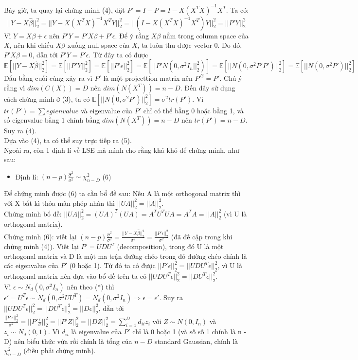 \documentclass[10pt]{article}
\begin{document}
\begin{enumerate}
Bây giờ, ta quay lại chứng minh (4), đặt $P'=I-P=I-X(X^{T}X)^{-1}X^{T}$. Ta có:
\[||Y-X\hat{\beta}||^2_2 = ||Y-X(X^{T}X)^{-1}X^{T}Y||_2^2=||(I-X(X^{T}X)^{-1}X^{T})Y||_2^2 = ||P'Y||_2^2 \]
Vì $Y=X\beta + \epsilon$ nên $P'Y=P'X\beta + P'\epsilon$. Để ý rằng $X\beta$ nằm trong column space của $X$, nên khi chiếu $X\beta$ xuống null space của $X$, ta luôn thu được vector 0. Do đó, $P'X\beta = 0$, dẫn tới $P'Y=P'\epsilon$. Từ đây ta có được 
\[\mathbb{E}[||Y-X\hat{\beta}||^2_2]=\mathbb{E}[||P'Y||_2^2]=\mathbb{E}[||P'\epsilon||_2^2] =\mathbb{E}[||P'N(0, \sigma^2 I_n||^2_2)] = \mathbb{E}[||N(0, \sigma^2 P' P')||^2_2] =\mathbb{E}[||N(0, \sigma^2 P')||^2_2]\]
Dấu bằng cuối cùng xảy ra vì $P'$ là một projecttion matrix nên $P'^2=P'$. Chú ý rằng vì $dim(C(X))=D$ nên $dim(N(X^{T}))=n-D$. Đến đây sử dụng cách chứng minh ở (3), ta có $\mathbb{E}[||N(0, \sigma^2 P')||^2_2]=\sigma^2 tr(P')$. Vì $tr(P')=\sum egienvalue$ và eigenvalue của $P'$ chỉ có thể bằng 0 hoặc bằng 1, và số eigenvalue bằng 1 chính bằng $dim(N(X^{T}))=n-D$ nên  $tr(P')=n - D$. Suy ra (4).\\

Dựa vào (4), ta có thể suy trực tiếp ra (5).\\

Ngoài ra, còn 1 định lí về LSE mà mình cho rằng khá khó để chứng minh, như sau:
\begin{itemize}

\item Định lí: $(n-p)\frac{\hat{\sigma}^2}{\sigma^2} \sim \chi^2_{n-D}$ (6)


\end{itemize}
Để chứng minh được (6) ta cần bổ đề sau: Nếu A là một orthogonal matrix thì với X bất kì thỏa mãn phép nhân thì $||UA||_2^{2}=||A||_2^{2}$.\\
Chứng minh bổ đề: $||UA||_2^{2}=(UA)^{T}(UA)=A^{T}U^{T}UA = A^{T}A=||A||_2^{2}$ (vì U là orthogonal matrix).\\

Chứng minh (6): viết lại $(n-p)\frac{\hat{\sigma}^2}{\sigma^2}= \frac{||Y-X\hat{\beta}||^2_2}{\sigma^2} = \frac{||P'\epsilon||^2_2}{\sigma^2}$ (đã đề cập trong khi chứng minh (4)). Viết lại $P' = UDU^{T}$ (decomposition), trong đó U là một orthogonal matrix và D là một ma trận đường chéo trong đó đường chéo chính là các eigenvalue của $P'$ (0 hoặc 1). Từ đó ta có được $||P'\epsilon||^2_2 = ||UDU^{T}\epsilon||^2_2$, vì U là orthogonal matrix nên dựa vào bổ đề trên ta có $||UDU^{T}\epsilon||^2_2=||DU^{T}\epsilon||^2_2$.\\
Vì $\epsilon \sim N_d(0, \sigma^2 I_n)$ nên theo (*) thì $\epsilon'=U^{T}\epsilon \sim N_d(0, \sigma^2UU^{T})=N_d(0, \sigma^2 I_n) \Rightarrow \epsilon = \epsilon'$. Suy ra $||UDU^{T}\epsilon||^2_2=||DU^{T}\epsilon||^2_2=||D\epsilon||^2_2$, dẫn tới $\frac{||P'\epsilon||^2_2}{\sigma^2}=||P'\frac{\epsilon}{\sigma}||^2_2=||P'Z||^2_2=||DZ||_2^2 = \sum_{i=1}^{D}d_{ii} z_i$ với $Z \sim N(0, I_n)$ và $z_i \sim N_d(0, 1)$. Vì $d_{ii}$ là eigenvalue của $P'$ chỉ là 0 hoặc 1 (và số số 1 chính là n -D) nên biểu thức vừa rồi chính là tổng của $n -D$ standard Gaussian, chính là $\chi_{n-D}^2$ (điều phải chứng minh).






\end{enumerate}
\end{document}
